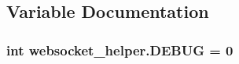\subsection{Variable Documentation}
\hypertarget{namespacewebsocket__helper_a25d3867ad49b6653bf93c082f389f11a}{
\subsubsection[{D\-E\-B\-U\-G}]{\setlength{\rightskip}{0pt plus 5cm}int websocket\-\_\-helper.\-D\-E\-B\-U\-G = 0}}\label{namespacewebsocket__helper_a25d3867ad49b6653bf93c082f389f11a}

